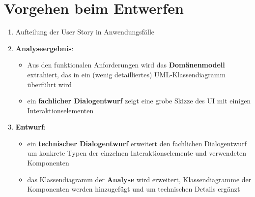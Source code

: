 \section{Vorgehen beim Entwerfen}

\begin{tcolorbox}[title=Vorgehen beim Entwerfen]
    \begin{enumerate}
        \item Aufteilung der User Story in Anwendungsfälle
        \item \textbf{Analyseergebnis}:
        \begin{itemize}
            \item  Aus den funktionalen Anforderungen wird das \textbf{Domänenmodell} extrahiert, das in ein (wenig detailliertes) UML-Klassendiagramm überführt wird
            \item  ein \textbf{fachlicher Dialogentwurf} zeigt eine grobe Skizze des UI mit einigen Interaktionselementen
        \end{itemize}
        \item \textbf{Entwurf}:
        \begin{itemize}
            \item ein \textbf{technischer Dialogentwurf} erweitert den fachlichen Dialogentwurf um konkrete Typen der einzelnen Interaktionselemente und verwendeten Komponenten
            \item das Klassendiagramm der \textbf{Analyse} wird erweitert, Klassendiagramme der Komponenten werden hinzugefügt und um technischen Details ergänzt
        \end{itemize}
    \end{enumerate}
\end{tcolorbox}